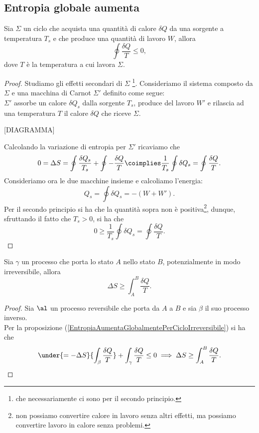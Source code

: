 \subsection{Entropia globale aumenta}
\begin{proposition}\label{EntropiaAumentaGlobalmentePerCicloIrreversibile}
Sia $\Sigma$ un ciclo che acquista una quantit\`a di calore $\delta Q$ da una sorgente a temperatura $T_s$ e che produce una quantit\`a di lavoro $W$, allora \[\oint \frac{\delta Q}T\leq 0,\]
dove $T$ \`e la temperatura a cui lavora $\Sigma$.
\end{proposition}
\begin{proof}
Studiamo gli effetti secondari di $\Sigma$ \footnote{che necessariamente ci sono per il secondo principio.}.
Consideriamo il sistema composto da $\Sigma$ e una macchina di Carnot $\Sigma'$ definito come segue:\\
$\Sigma'$ assorbe un calore $\delta Q_s$ dalla sorgente $T_s$, produce del lavoro $W'$ e rilascia ad una temperatura $T$ il calore $\delta Q$ che riceve $\Sigma$.


[DIAGRAMMA]

\noindent Calcolando la variazione di entropia per $\Sigma'$ ricaviamo che
\[0=\Delta S=\oint \frac{\delta Q_s}{T_s}+\oint -\frac{\delta Q}T\coimplies \frac1{T_s}\oint \delta Q_s=\oint \frac{\delta Q}T.\]
Consideriamo ora le due macchine insieme e calcoliamo l'energia:
\[Q_s=\oint \delta Q_s=-(W+W').\]
Per il secondo principio si ha che la quantit\`a sopra non \`e positiva\footnote{non possiamo convertire calore in lavoro senza altri effetti, ma possiamo convertire lavoro in calore senza problemi.}, dunque, sfruttando il fatto che $T_s>0$, si ha che
\[0\geq \frac1{T_s}\oint \delta Q_s=\oint \frac{\delta Q}T.\]
\end{proof}



\begin{theorem}\label{VariazioneEntropiaSuperaIntegrale}
Sia $\gamma$ un processo che porta lo stato $A$ nello stato $B$, potenzialmente in modo irreversibile, allora
\[\Delta S\geq \int_A^B\frac{\delta Q}T.\]
\end{theorem}
\begin{proof}
Sia $\al$ un processo reversibile che porta da $A$ a $B$ e sia $\beta$ il suo processo inverso.\\
Per la proposizione (\ref{EntropiaAumentaGlobalmentePerCicloIrreversibile}) si ha che
\[\under{=-\Delta S}{\int_\beta\frac{\delta Q}T}+\int_\gamma\frac{\delta Q}T\leq 0\implies \Delta S\geq \int_A^B\frac{\delta Q}T.\]
\end{proof}


